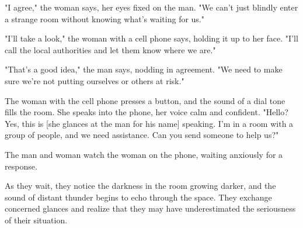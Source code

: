 \documentclass[smalldemyvopaper,11pt,twoside,onecolumn,openright,extrafontsizes]{memoir}
\begin{document}
"I agree," the woman says, her eyes fixed on the man. "We can't just blindly enter a strange room without knowing what's waiting for us."\par
"I'll take a look," the woman with a cell phone says, holding it up to her face. "I'll call the local authorities and let them know where we are."\par
"That's a good idea," the man says, nodding in agreement. "We need to make sure we're not putting ourselves or others at risk."\par
The woman with the cell phone presses a button, and the sound of a dial tone fills the room. She speaks into the phone, her voice calm and confident. "Hello? Yes, this is [she glances at the man for his name] speaking. I'm in a room with a group of people, and we need assistance. Can you send someone to help us?"\par
The man and woman watch the woman on the phone, waiting anxiously for a response.\par
As they wait, they notice the darkness in the room growing darker, and the sound of distant thunder begins to echo through the space. They exchange concerned glances and realize that they may have underestimated the seriousness of their situation.\par
\end{document}
